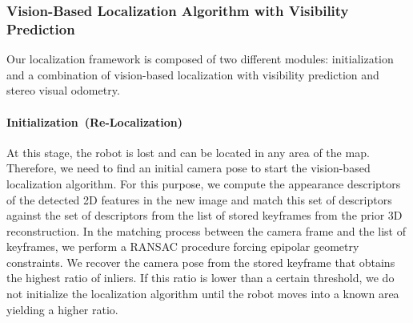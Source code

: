\subsubsection{Vision-Based Localization Algorithm with Visibility Prediction}\label{sec:vision_algorithm}
Our localization framework is composed of two different modules: initialization and a combination of vision-based localization with visibility prediction and stereo visual odometry. 

\paragraph{Initialization~(Re-Localization)}
At this stage, the robot is lost and can be located in any area of the map. Therefore, we need to find an initial camera pose to start the vision-based localization algorithm. For this purpose, we compute the appearance descriptors of the detected 2D features in the new image and match this set of descriptors against the set of descriptors from the list of stored keyframes from the prior 3D reconstruction. In the matching process between the camera frame and the list of keyframes, we perform a RANSAC procedure forcing epipolar geometry constraints. We recover the camera pose from the stored keyframe that obtains the highest ratio of inliers. If this ratio is lower than a certain threshold, we do not initialize the localization algorithm until the robot moves into a known area yielding a higher ratio.

